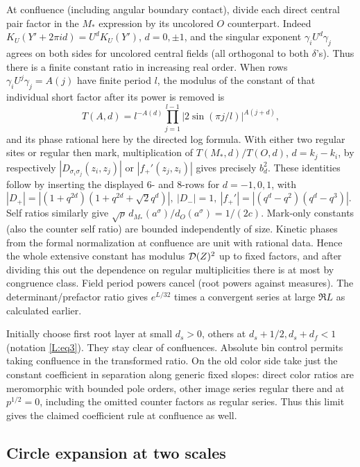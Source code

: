At confluence (including angular boundary contact), divide each direct central pair factor in the \(M_*\) expression by its uncolored \(O\) counterpart. Indeed \(K_U(Y'+2\pi i d)=U^dK_U(Y')\), \(d=0,\pm1\), and the singular exponent \(\gamma_i U^d\gamma_j\) agrees on both sides for uncolored central fields (all orthogonal to both \(\delta\)'s). Thus there is a finite constant ratio in increasing real order. When rows \(\gamma_i U^j\gamma_j=A(j)\) have finite period \(l\), the modulus of the constant of that individual short factor after its power is removed is
\[
 T(A,d)=l^{-A(d)}\prod_{j=1}^{l-1}|2\sin(\pi j/l)|^{A(j+d)},
\]
and its phase rational here by the directed log formula. With either two regular sites or regular then mark, multiplication of \(T(M_*,d)/T(O,d)\), \(d=k_j-k_i\), by respectively \(|D_{\sigma_i\sigma_j}(z_i,z_j)|\) or \(|f_+'(z_j,z_i)|\) gives precisely \(b_d^2\). These identities follow by inserting the displayed 6- and 8-rows for \(d=-1,0,1\), with \(|D_+|=|(1+q^{2d})(1+q^{2d}+\sqrt2 q^d)|,\ |D_-|=1,\ |f_+'|=|(q^d-q^2)(q^d-q^3)|\). Self ratios similarly give \(\sqrt\rho\, d_{M_*}(a^\sigma)/d_O(a^\sigma)=1/(2c)\). Mark-only constants (also the counter self ratio) are bounded independently of size. Kinetic phases from the formal normalization at confluence are unit with rational data. Hence the whole extensive constant has modulus \({\cal D}(Z)^2\) up to fixed factors, and after dividing this out the dependence on regular multiplicities there is at most by congruence class. Field period powers cancel (root powers against measures). The determinant/prefactor ratio gives \(e^{L/32}\) times a convergent series at large \(\Re L\) as calculated earlier.

Initially choose first root layer at small \(d_s>0\), others at \(d_s+1/2,d_s+d_f<1\) (notation \eqref{L:eq3}). They stay clear of confluences. Absolute bin control permits taking confluence in the transformed ratio. On the old color side take just the constant coefficient in separation along generic fixed slopes: direct color ratios are meromorphic with bounded pole orders, other image series regular there and at \(p^{1/2}=0\), including the omitted counter factors as regular series. Thus this limit gives the claimed coefficient rule at confluence as well.


\subsection{Circle expansion at two scales}\label{L:step15}

